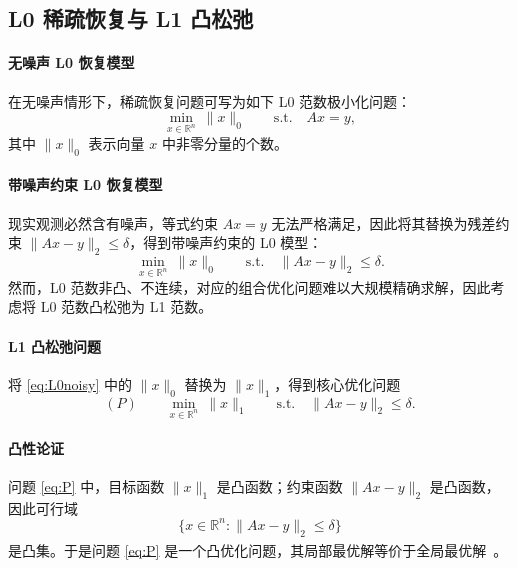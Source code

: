 \documentclass[UTF8]{ctexart}
\numberwithin{figure}{section}
\newcommand{\scite}[1]{\textsuperscript{\cite{#1}}}
\theoremstyle{definition}
\theoremstyle{examplestyle}
\theoremstyle{remark}
\begin{document}
\subsection{L0 稀疏恢复与 L1 凸松弛}
\label{sec:relaxation}

\paragraph*{无噪声 L0 恢复模型}
在无噪声情形下，稀疏恢复问题可写为如下 L0 范数极小化问题：
\begin{equation}
\label{eq:L0}
\min_{x\in\mathbb{R}^n}\ \|x\|_0 \qquad \text{s.t.} \quad Ax=y,
\end{equation}
其中 $\|x\|_0$ 表示向量 $x$ 中非零分量的个数。

\paragraph*{带噪声约束 L0 恢复模型}
现实观测必然含有噪声，等式约束 $Ax=y$ 无法严格满足，因此将其替换为残差约束 $\|Ax-y\|_2\le\delta$，得到带噪声约束的 L0 模型：
\begin{equation}
\label{eq:L0noisy}
\min_{x\in\mathbb{R}^n}\ \|x\|_0 \qquad \text{s.t.} \quad \|Ax-y\|_2\le\delta.
\end{equation}
然而，L0 范数非凸、不连续，对应的组合优化问题难以大规模精确求解，因此考虑将 L0 范数凸松弛为 L1 范数。

\paragraph*{L1 凸松弛问题}
将 \eqref{eq:L0noisy} 中的 $\|x\|_0$ 替换为 $\|x\|_1$，得到核心优化问题
\begin{equation}
\label{eq:P}
(P)\qquad \min_{x\in\mathbb{R}^n}\ \|x\|_1 \qquad \text{s.t.} \quad \|Ax-y\|_2\le\delta.
\end{equation}

\paragraph*{凸性论证}
问题 \eqref{eq:P} 中，目标函数 $\|x\|_1$ 是凸函数；约束函数 $\|Ax-y\|_2$ 是凸函数，因此可行域
\[
\{x\in\mathbb{R}^n : \|Ax-y\|_2\le\delta\}
\]
是凸集。于是问题 \eqref{eq:P} 是一个凸优化问题，其局部最优解等价于全局最优解~\scite{boyd2004}。
\end{document}

